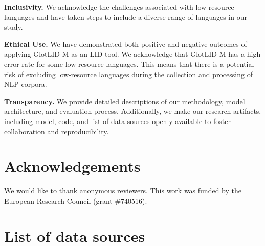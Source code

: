 \documentclass[11pt]{article}
\def\modelname{\mbox{GlotLID-M}\xspace}
\def\seclabel#1{\label{sec:#1}\label{p:#1}}
\begin{document}
\textbf{Inclusivity.}
We acknowledge the challenges associated with low-resource languages and have taken steps to include a diverse range of languages in our study. 


\textbf{Ethical Use.}
We have demonstrated both positive and negative outcomes of
applying \modelname as an LID tool. We acknowledge
that \modelname
has a high error rate for some low-resource languages.
This means that there is a  potential risk of
excluding low-resource languages during the collection and
processing of NLP corpora.



\textbf{Transparency.}
We provide detailed descriptions of our methodology, model
architecture, and evaluation process. Additionally, we  make
our research artifacts, including model, code, and list of data sources openly available
to foster collaboration and reproducibility.


\section{Acknowledgements}

We would like to thank anonymous reviewers.
This work was funded by the European Research
Council (grant \#740516).

\newpage




\clearpage
\appendix

\section{List of data sources}\seclabel{datasources}
\end{document}
